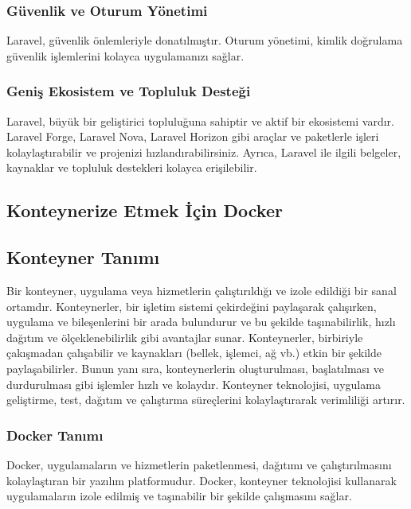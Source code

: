 \subsubsection{Güvenlik ve Oturum Yönetimi}
Laravel, güvenlik önlemleriyle donatılmıştır. Oturum yönetimi, kimlik doğrulama güvenlik işlemlerini kolayca uygulamanızı sağlar.
\subsubsection{Geniş Ekosistem ve Topluluk Desteği }
Laravel, büyük bir geliştirici topluluğuna sahiptir ve aktif bir ekosistemi vardır. Laravel Forge, Laravel Nova, Laravel Horizon gibi araçlar ve paketlerle işleri kolaylaştırabilir ve projenizi hızlandırabilirsiniz. Ayrıca, Laravel ile ilgili belgeler, kaynaklar ve topluluk destekleri kolayca erişilebilir.
\subsection{Konteynerize Etmek İçin \textbf{Docker }}
\subsection {Konteyner Tanımı }
Bir konteyner, uygulama veya hizmetlerin çalıştırıldığı ve izole edildiği bir sanal ortamdır. Konteynerler, bir işletim sistemi çekirdeğini paylaşarak çalışırken, uygulama ve bileşenlerini bir arada bulundurur ve bu şekilde taşınabilirlik, hızlı dağıtım ve ölçeklenebilirlik gibi avantajlar sunar. 
Konteynerler, birbiriyle çakışmadan çalışabilir ve kaynakları (bellek, işlemci, ağ vb.) etkin bir şekilde paylaşabilirler. Bunun yanı sıra, konteynerlerin oluşturulması, başlatılması ve durdurulması gibi işlemler hızlı ve kolaydır. 
Konteyner teknolojisi, uygulama geliştirme, test, dağıtım ve çalıştırma süreçlerini kolaylaştırarak verimliliği artırır.
\subsubsection{Docker Tanımı}

Docker, uygulamaların ve hizmetlerin paketlenmesi, dağıtımı ve çalıştırılmasını kolaylaştıran bir yazılım platformudur. Docker, konteyner teknolojisi kullanarak uygulamaların izole edilmiş ve taşınabilir bir şekilde çalışmasını sağlar.

